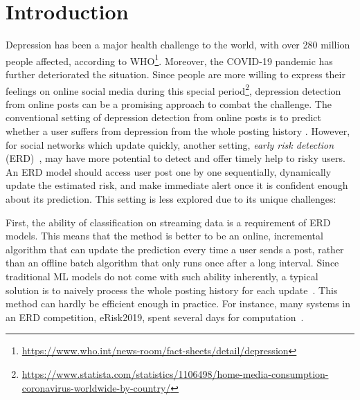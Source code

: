 \section{Introduction}

Depression has been a major health challenge to the world, with over 280 million people affected, according to WHO\footnote{\url{https://www.who.int/news-room/fact-sheets/detail/depression}}. Moreover, the COVID-19 pandemic has further deteriorated the situation. 
Since people are more 
willing to express their feelings on online social media during this 
special period\footnote{\url{https://www.statista.com/statistics/1106498/home-media-consumption-coronavirus-worldwide-by-country/}}, 
depression detection from online posts can be a promising approach 
to combat the challenge.
The conventional setting of depression detection from online posts is to predict whether a user suffers from depression from the whole posting history \cite{gui2019cooperative,zogan2021depressionnet}. However, for social networks which update quickly, 
another setting, \textit{early risk detection} (ERD)~\cite{losada2017erisk}, 
may have more potential to detect and offer timely help to risky users. 
An ERD model should access user post one by one sequentially, 
dynamically update the estimated risk, and make immediate alert once 
it is confident enough about its prediction. This setting is less explored due to 
its unique challenges: 

First, the ability of classification on streaming data is a requirement of ERD models. This means that the method is better to be an online, incremental algorithm that can update the prediction every time a user sends a post, rather than an offline batch algorithm that only runs once after a long interval. Since traditional ML models do not 
come with such ability inherently, a typical solution is to naively process 
the whole posting history for each update~\cite{trotzek2018utilizing}. 
This method can hardly be efficient enough in practice. 
For instance, many systems in an ERD competition, eRisk2019, spent several 
days for computation~\cite{losada2019overview}. 

